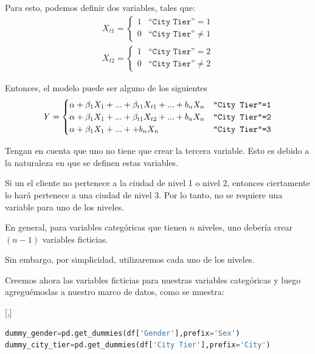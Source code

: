 Para esto, podemos definir dos variables, tales que:
\begin{align}
 X_{t1}=
 \begin{cases}
  1 & \texttt{``City Tier''}=1 \\
  0 & \texttt{``City Tier''}\neq 1
 \end{cases}
 \end{align}
 \begin{align}
 X_{t2}=
 \begin{cases}
  1 & \texttt{``City Tier''}=2 \\
  0 & \texttt{``City Tier''}\neq 2
 \end{cases}
\end{align}


Entonces, el modelo puede ser alguno de los siguientes
\begin{align}
 Y=
 \begin{cases}
  \alpha + \beta_{1}X_{1}+...+\beta_{t1}X_{t1}+...+b_{n}X_{n} & \texttt{``City Tier''=1}\\
  \alpha + \beta_{1}X_{1}+...+\beta_{t1}X_{t2}+...+b_{n}X_{n} & \texttt{``City Tier''=2}\\
  \alpha + \beta_{1}X_{1}+...++b_{n}X_{n} & \texttt{``City Tier''=3}\\
 \end{cases}
\end{align}


Tengan en cuenta que uno no tiene que crear la tercera variable. Esto es
debido a la naturaleza en que se definen estas variables.


Si un
el cliente no pertenece a la ciudad de nivel 1 o nivel 2, entonces ciertamente lo hará
pertenece a una ciudad de nivel 3. Por lo tanto, no se requiere una variable para uno de
los niveles.


\begin{rem}
 En general, para variables categóricas que tienen $n$ niveles, uno
debería crear $(n-1)$ variables ficticias.
\end{rem}

Sin embargo, por simplicidad, utilizaremos cada uno de los niveles.


Creemos ahora las variables ficticias para nuestras
variables categóricas y luego agreguémoslas a nuestro marco de datos, como se muestra:


[,]{}
\tiny
\begin{lstlisting}[language=Python]
dummy_gender=pd.get_dummies(df['Gender'],prefix='Sex')
dummy_city_tier=pd.get_dummies(df['City Tier'],prefix='City')
\end{lstlisting}



